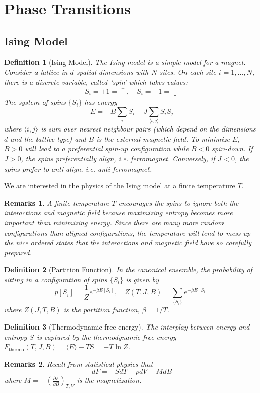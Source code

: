 \documentclass[a4paper]{article}
\newtheorem{remarks}{Remarks}[section]
\theoremstyle{new}
\newtheorem{defi}{Definition}[section]
\begin{document}
\newpage
\section{Phase Transitions}
\subsection{Ising Model}
\begin{defi}[Ising Model]
The Ising model is a simple model for a magnet. Consider a lattice in $d$ spatial dimensions with $N$ sites. On each site $i=1,\dots,N$, there is a discrete variable, called `spin' which takes values:
$$S_i=+1=\uparrow,\quad S_i=-1=\downarrow$$
The system of spins $\{S_i\}$ has energy
$$E=-B\sum_iS_i-J\sum_{\langle i,j\rangle}S_iS_j$$
where $\langle i,j\rangle$ is sum over nearest neighbour pairs (which depend on the dimensions $d$ and the lattice type) and $B$ is the external magnetic field. To minimize $E$, $B>0$ will lead to a preferential spin-up configuration while $B<0$ spin-down. If $J>0$, the spins preferentially align, i.e. ferromagnet. Conversely, if $J<0$, the spins prefer to anti-align, i.e. anti-ferromagnet.
\end{defi}
We are interested in the physics of the Ising model at a finite temperature $T$.
\begin{remarks}
A finite temperature $T$ encourages the spins to ignore both the interactions and magnetic field because maximizing entropy becomes more important than minimizing energy. Since there are many more random configurations than aligned configurations, the temperature will tend to mess up the nice ordered states that the interactions and magnetic field have so carefully prepared.
\end{remarks}
\begin{defi}[Partition Function]
In the canonical ensemble, the probability of sitting in a configuration of spins $\{S_i\}$ is given by
$$p[S_i]=\frac{1}{Z}e^{-\beta E[S_i]},\quad Z(T,J,B)=\sum_{\{S_i\}}e^{-\beta E[S_i]}$$
where $Z(J,T,B)$ is the partition function, $\beta=1/T$.
\end{defi}
\begin{defi}[Thermodynamic free energy]
The interplay between energy and entropy $S$ is captured by the thermodynamic free energy $F_{\text{thermo}}(T,J,B)=\langle E\rangle-TS=-T\ln Z$. 
\end{defi}
\begin{remarks}
Recall from statistical physics that
$$dF=-SdT-pdV-MdB$$
where $M=-(\frac{\partial F}{\partial B})_{T,V}$ is the magnetization.
\end{remarks}
\end{document}
